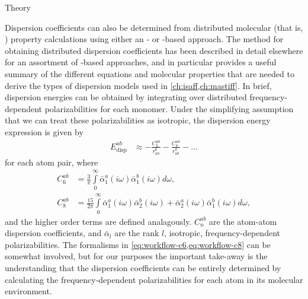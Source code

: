 \begin{subsubsection}{Theory}

Dispersion coefficients can also be determined from distributed molecular
(that is, \aim)
property calculations using either an \isa- or \dma-based approach. The method
for obtaining distributed dispersion coefficients has been described in detail elsewhere for an assortment of \dma-based
approaches,
\cite{Williams2003,Misquitta2008,McDaniel2012,McDaniel2013,stone2013theory,McDaniel2014a}
and  in particular provides a useful summary of the
different equations and molecular properties that are needed to derive
the types of dispersion models used in \cref{ch:isaff,ch:mastiff}.
In brief, \aim dispersion energies can be obtained by integrating over
distributed 
frequency-dependent polarizabilities for each monomer.
Under the simplifying assumption that we can treat these polarizabilities as
isotropic,
the dispersion energy expression is given by
\begin{align}
\label{eq:workflow-edisp}
E^{ab}_{\text{disp}} &\approx - \frac{C^{ab}_6}{r_{ab}^6} - \frac{C^{ab}_8}{r_{ab}^8} - \ldots
\end{align}
for each atom pair, where 
\begin{align}
\label{eq:workflow-c6}
C^{ab}_6 &= \frac{3}{\pi} \int\limits_{0}^{\infty} \bar{\alpha}^a_{1}
(i\omega) \bar{\alpha}^b_{1} (i\omega) d\omega , \\
%
C^{ab}_8 &= \frac{15}{2\pi} \int\limits_{0}^{\infty} 
\bar{\alpha}^a_{1} (i\omega) \bar{\alpha}^b_{2} (i\omega) 
+ \bar{\alpha}^a_{2} (i\omega) \bar{\alpha}^b_{1} (i\omega) 
d\omega , 
\label{eq:workflow-c8}
\end{align}
and the higher order terms are defined analagously. $C^{ab}_n$ are the
atom-atom dispersion coefficients, and $\bar{\alpha}_l$ are the
rank $l$, isotropic, frequency-dependent polarizabilities. 
The formalisms in \cref{eq:workflow-c6,eq:workflow-c8} can be somewhat
involved,
but for our purposes the important take-away is the understanding that the dispersion
coefficients can be entirely determined by calculating the frequency-dependent
polarizabilities for each atom in its molecular environment.


\end{subsubsection}
